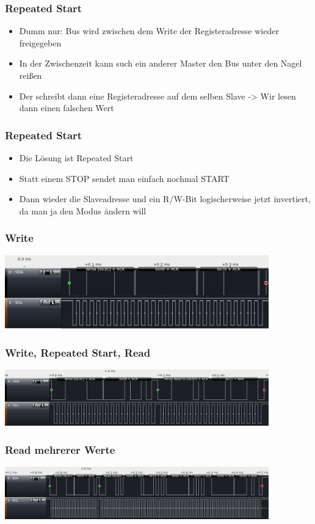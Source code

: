 \documentclass[ngerman,compress]{beamer}
\begin{document}
\begin{frame}
	\frametitle{Repeated Start}
	\begin{itemize}
		\item Dumm nur: Bus wird zwischen dem Write der Registeradresse wieder freigegeben
		\item In der Zwischenzeit kann such ein anderer Master den Bus unter den Nagel reißen
		\item Der schreibt dann eine Registeradresse auf dem selben Slave -> Wir lesen dann einen falschen Wert
	\end{itemize}
\end{frame}

\begin{frame}
	\frametitle{Repeated Start}
	\begin{itemize}
		\item Die Lösung ist Repeated Start
		\item Statt einem STOP sendet man einfach nochmal START
		\item Dann wieder die Slaveadresse und ein R/W-Bit logischerweise jetzt invertiert, da man ja den Modus ändern will
	\end{itemize}
\end{frame}

\begin{frame}
	\frametitle{Write}
	\includegraphics[width=4.5in]{reg_write}
\end{frame}

\begin{frame}
	\frametitle{Write, Repeated Start, Read}
	\includegraphics[width=4.5in]{repeated_start}
\end{frame}

\begin{frame}
	\frametitle{Read mehrerer Werte}
	\includegraphics[width=4.5in]{multiread}
\end{frame}
\end{document}
